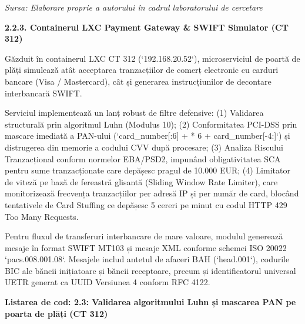 \documentclass[
]{article}
\begin{document}
\emph{Sursa: Elaborare proprie a autorului în cadrul laboratorului de
cercetare}

\textbf{2.2.3. Containerul LXC Payment Gateway \& SWIFT Simulator (CT
312)}

Găzduit în containerul LXC CT 312 (`192.168.20.52`), microserviciul de
poartă de plăți simulează atât acceptarea tranzacțiilor de comerț
electronic cu carduri bancare (Visa / Mastercard), cât și generarea
instrucțiunilor de decontare interbancară SWIFT.

Serviciul implementează un lanț robust de filtre defensive: (1)
Validarea structurală prin algoritmul Luhn (Modulus 10); (2)
Conformitatea PCI-DSS prin mascare imediată a PAN-ului
(`card\_number{[}:6{]} + \textquotesingle*\textquotesingle{} * 6 +
card\_number{[}-4:{]}`) și distrugerea din memorie a codului CVV după
procesare; (3) Analiza Riscului Tranzacțional conform normelor EBA/PSD2,
impunând obligativitatea SCA pentru sume tranzacționate care depășesc
pragul de 10.000 EUR; (4) Limitator de viteză pe bază de fereastră
glisantă (Sliding Window Rate Limiter), care monitorizează frecvența
tranzacțiilor per adresă IP și per număr de card, blocând tentativele de
Card Stuffing ce depășesc 5 cereri pe minut cu codul HTTP 429 Too Many
Requests.

Pentru fluxul de transferuri interbancare de mare valoare, modulul
generează mesaje în format SWIFT MT103 și mesaje XML conforme schemei
ISO 20022 `pacs.008.001.08`. Mesajele includ antetul de afaceri BAH
(`head.001`), codurile BIC ale băncii inițiatoare și băncii receptoare,
precum și identificatorul universal UETR generat ca UUID Versiunea 4
conform RFC 4122.

\textbf{Listarea de cod: 2.3: Validarea algoritmului Luhn și mascarea
PAN pe poarta de plăți (CT 312)}
\end{document}
